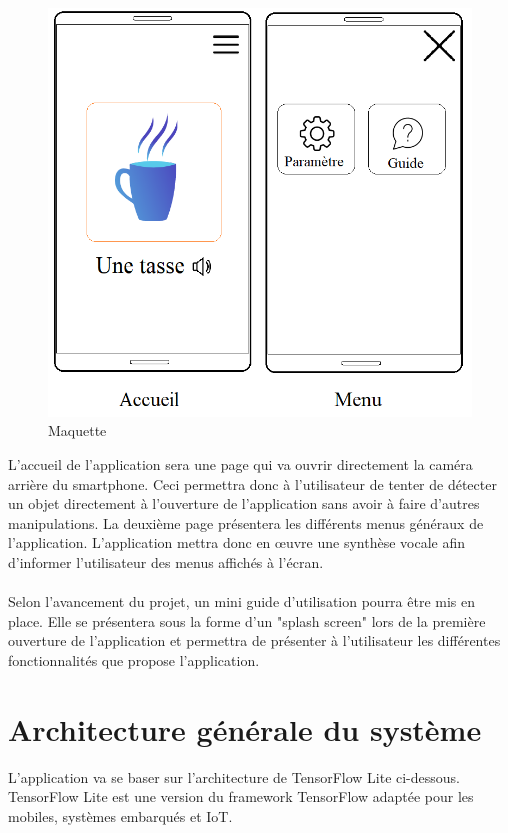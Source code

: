 \documentclass[CDS,UTF8,final]{EPURapport}
\begin{document}
\begin{figure}[h!]
  \includegraphics[width=\linewidth]{images/Maquette.png}
  \caption{Maquette}
  \label{fig:maquette}
\end{figure}

\par
L'accueil de l'application sera une page qui va ouvrir directement la caméra arrière du smartphone. Ceci permettra donc à l'utilisateur de tenter de détecter un objet directement à l'ouverture de l'application sans avoir à faire d'autres manipulations. La deuxième page présentera les différents menus généraux de l'application. L'application mettra donc en œuvre une synthèse vocale afin d'informer l'utilisateur des menus affichés à l'écran.\par 

\paragraph{}
Selon l'avancement du projet, un mini guide d'utilisation pourra être mis en place. Elle se présentera sous la forme d'un "splash screen" lors de la première ouverture de l'application et permettra de présenter à l'utilisateur les différentes fonctionnalités que propose l'application.

\section{Architecture générale du système}
L'application va se baser sur l'architecture de TensorFlow Lite ci-dessous. TensorFlow Lite est une version du framework TensorFlow adaptée pour les mobiles, systèmes embarqués et IoT.
\end{document}
